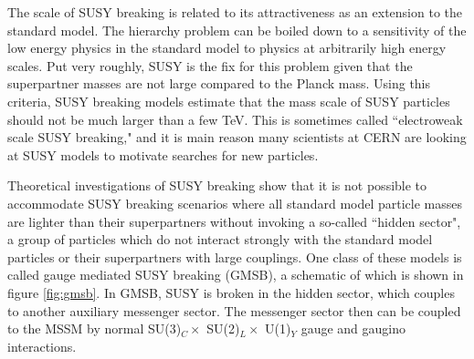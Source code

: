     The scale of SUSY breaking is related to its attractiveness as an extension to the standard model. The hierarchy problem can be boiled down to a sensitivity of the low energy physics in the standard model to physics at arbitrarily high energy scales. Put very roughly, SUSY is the fix for this problem given that the superpartner masses are not large compared to the Planck mass.\cite[pg. 11]{susy_primer} Using this criteria, SUSY breaking models estimate that the mass scale of SUSY particles should not be much larger than a few TeV. This is sometimes called ``electroweak scale SUSY breaking," and it is main reason many scientists at CERN are looking at SUSY models to motivate searches for new particles.

    Theoretical investigations of SUSY breaking show that it is not possible to accommodate SUSY breaking scenarios where all standard model particle masses are lighter than their superpartners without invoking a so-called ``hidden sector", a group of particles which do not interact strongly with the standard model particles or their superpartners with large couplings. One class of these models is called gauge mediated SUSY breaking (GMSB), a schematic of which is shown in figure \ref{fig:gmsb}. In GMSB, SUSY is broken in the hidden sector, which couples to another auxiliary messenger sector. The messenger sector then can be coupled to the MSSM by normal SU(3)$_C \times $ SU(2)$_L \times $ U(1)$_Y $ gauge and gaugino interactions.\cite{gmsb}

